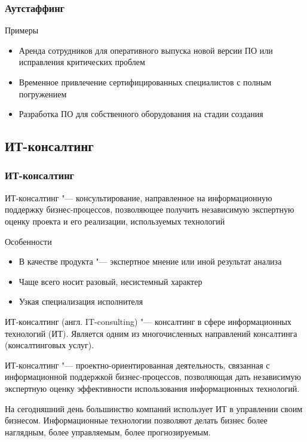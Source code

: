 \documentclass{../industrial-development}
\begin{document}
\begin{frame} \frametitle{Аутстаффинг}
	\begin{block}{Примеры}
		\begin{itemize}
			\item Аренда сотрудников для оперативного выпуска новой версии ПО или исправления критических проблем
			\item Временное привлечение сертифицированных специалистов с полным погружением
			\item Разработка ПО для собственного оборудования на стадии создания
		\end{itemize}
	\end{block}
\end{frame}


\subsection{ИТ-консалтинг}


\begin{frame} \frametitle{ИТ-консалтинг}
	\begin{block}{}
		\alert{ИТ-консалтинг} "--- консультирование, направленное на  информационную поддержку бизнес-процессов, позволяющее получить независимую экспертную оценку проекта и его реализации, используемых технологий
	\end{block}
	\begin{block}{Особенности}
		\begin{itemize}
			\item В качестве продукта "--- экспертное мнение или иной результат анализа
			\item Чаще всего носит разовый, несистемный характер
			\item Узкая специализация исполнителя
		\end{itemize}
	\end{block}
\end{frame}

\lecturenotes

ИТ-консалтинг (англ. IT-consulting) "--- консалтинг в сфере информационных технологий (ИТ). Является одним из многочисленных направлений консалтинга (консалтинговых услуг).

ИТ-консалтинг "--- проектно-ориентированная деятельность, связанная с информационной поддержкой бизнес-процессов, позволяющая дать независимую экспертную оценку эффективности использования информационных технологий.

На сегодняшний день большинство компаний использует ИТ в управлении своим бизнесом. Информационные технологии позволяют делать бизнес более наглядным, более управляемым, более прогнозируемым.
\end{document}
